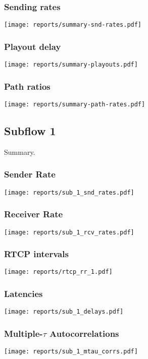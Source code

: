 \documentclass[a4paper]{article}
\begin{document}
\subsubsection{Sending rates}
\texttt{[image: reports/summary-snd-rates.pdf]}

\subsubsection{Playout delay}
\texttt{[image: reports/summary-playouts.pdf]}

\subsubsection{Path ratios}
\texttt{[image: reports/summary-path-rates.pdf]}



\subsection{Subflow 1}
Summary.

\subsubsection{Sender Rate}
\texttt{[image: reports/sub\_1\_snd\_rates.pdf]}

\subsubsection{Receiver Rate}
\texttt{[image: reports/sub\_1\_rcv\_rates.pdf]}

\subsubsection{RTCP intervals}
\texttt{[image: reports/rtcp\_rr\_1.pdf]}

\subsubsection{Latencies}
\texttt{[image: reports/sub\_1\_delays.pdf]}

\subsubsection{Multiple-$\tau$ Autocorrelations}
\texttt{[image: reports/sub\_1\_mtau\_corrs.pdf]}
\end{document}
